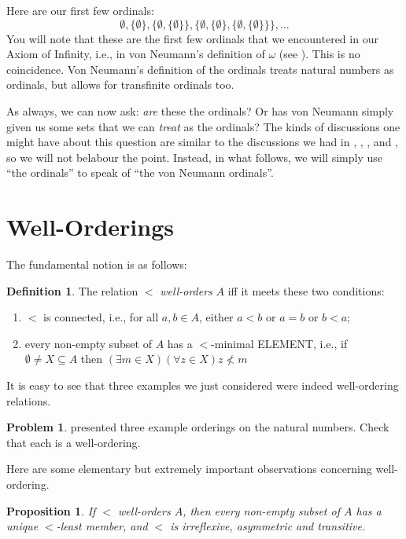 \documentclass[10pt,a4paper]{article}
\makeatletter
\newcommand*{\olup}[1]{\MakeUppercase{#1}}
\theoremstyle{plain}
\newtheorem{prop}[thm]{Proposition}
\theoremstyle{definition}
\newtheorem{defn}[thm]{Definition}
\newtheorem{prob}{Problem}[section]
\theoremstyle{remark}
\newcommand*{\olfileid}[3]{}
\newcommand*{\olsection}[1]{\section*{#1}}
\newcommand*{\ollabel}[1]{\label{#1}}
\newcommand{\olref}{\@ifnextchar[{\olref@i}{\olref@final}}
\def\olref@i[#1]{\@ifnextchar[{\olref@ii}{\olref@final}}
\def\olref@ii[#1]{\@ifnextchar[{\olref@iii}{\olref@final}}
\def\olref@iii[#1]{\olref@final}
\def\olref@final#1{\ref{#1}}
\makeatother
\begin{document}
Here are our first few ordinals:
\[
	\emptyset, \{\emptyset\}, 
	\{\emptyset, \{\emptyset\}\}, 
	\{\emptyset, \{\emptyset\}, \{\emptyset, \{\emptyset\}\}\}, \ldots
\]
You will note that these are the first few ordinals that we
encountered in our Axiom of Infinity, i.e., in von Neumann's
definition of $\omega$ (see \olref[sth][z][infinity-again]{sec}). This
is no coincidence. Von Neumann's definition of the ordinals treats
natural numbers as ordinals, but allows for transfinite ordinals too. 

As always, we can now ask: \emph{are} these the ordinals? Or has von
Neumann simply given us some sets that we can \emph{treat} as the
ordinals? The kinds of discussions one might have about this question
are similar to the discussions we had in \olref[sfr][rel][ref]{sec},
\olref[sfr][arith][ref]{sec},
\olref[sfr][infinite][dedekindsproof]{sec}, and
\olref[sth][z][nat]{sec}, so we will not belabour the point.
Instead, in what follows, we will simply use ``the ordinals'' to speak
of ``the von Neumann ordinals''. 



\olfileid{sth}{ordinals}{wo}
\olsection{Well-Orderings}

The fundamental notion is as follows:

\begin{defn}
The relation $<$ \emph{well-orders} $A$ iff it meets these two conditions:
\begin{enumerate}
	\item $<$ is connected, i.e., for all $a, b \in A$, either $a < b$
	or $a = b$ or $b < a$;
	\item every non-empty subset of $A$ has a $<$-minimal \olup{element},
	i.e., if $\emptyset \neq X \subseteq A$ then $(\exists m \in
	X)(\forall z \in X)z \nless m$
\end{enumerate}
\end{defn}

It is easy to see that three examples we just considered were indeed
well-ordering relations. 

\begin{prob}
 presented three example orderings
on the natural numbers. Check that each is a well-ordering.
\end{prob}

Here are some elementary but extremely important observations
concerning well-ordering.

\begin{prop}\ollabel{wo:strictorder}
If $<$ well-orders $A$, then every non-empty subset of $A$ has a unique
$<$-least member, and $<$ is irreflexive, asymmetric and transitive.
\end{prop}
\end{document}
